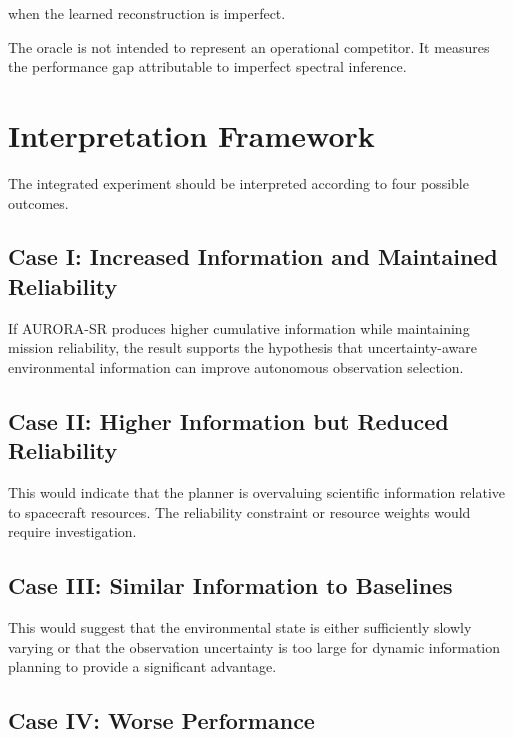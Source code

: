 \documentclass[11pt,a4paper]{article}
\begin{document}
when the learned reconstruction is imperfect.

The oracle is not intended to represent an operational competitor.
It measures the performance gap attributable to imperfect spectral
inference.


\section{Interpretation Framework}

The integrated experiment should be interpreted according to four
possible outcomes.

\subsection{Case I: Increased Information and Maintained Reliability}

If AURORA-SR produces higher cumulative information while maintaining
mission reliability, the result supports the hypothesis that
uncertainty-aware environmental information can improve autonomous
observation selection.

\subsection{Case II: Higher Information but Reduced Reliability}

This would indicate that the planner is overvaluing scientific
information relative to spacecraft resources. The reliability
constraint or resource weights would require investigation.

\subsection{Case III: Similar Information to Baselines}

This would suggest that the environmental state is either sufficiently
slowly varying or that the observation uncertainty is too large for
dynamic information planning to provide a significant advantage.

\subsection{Case IV: Worse Performance}
\end{document}
